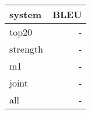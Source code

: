 \begin{tabular}{lr}
\toprule
system & BLEU \\
\toprule
top20 & - \\
strength & - \\
m1 & - \\
joint & - \\
all & - \\
\bottomrule
\end{tabular}